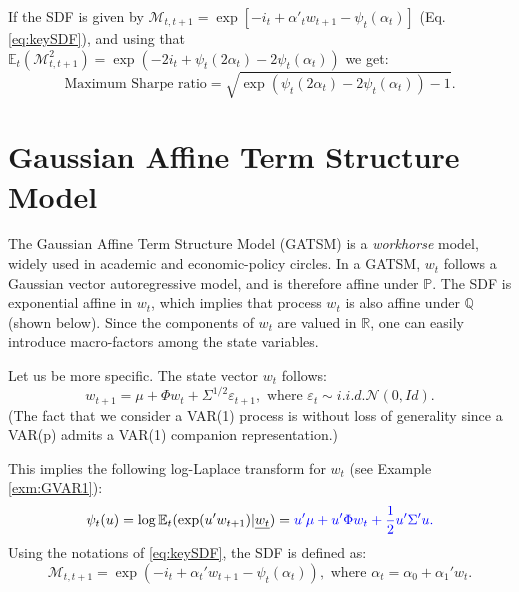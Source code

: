 \documentclass[
  12pt,
]{book}
\theoremstyle{definition}
\theoremstyle{definition}
\theoremstyle{definition}
\theoremstyle{definition}
\theoremstyle{remark}
\begin{document}
If the SDF is given by \(\mathcal{M}_{t,t+1} = \exp[-i_{t}+\alpha'_tw_{t+1}-\psi_t(\alpha_t)]\) (Eq. \eqref{eq:keySDF}), and using that \(\mathbb{E}_t(\mathcal{M}_{t,t+1}^2)=\exp(-2i_t+\psi_t(2\alpha_t)-2\psi_t(\alpha_t))\) we get:
\[
\mbox{Maximum Sharpe ratio} = \sqrt{\exp(\psi_t(2\alpha_t)-2\psi_t(\alpha_t)) - 1}.
\]

\hypertarget{RiskFreeGaussian}{%
\section{Gaussian Affine Term Structure Model}\label{RiskFreeGaussian}}

The Gaussian Affine Term Structure Model (GATSM) is a \emph{workhorse} model, widely used in academic and economic-policy circles. In a GATSM, \(w_t\) follows a Gaussian vector autoregressive model, and is therefore affine under \(\mathbb{P}\). The SDF is exponential affine in \(w_t\), which implies that process \(w_t\) is also affine under \(\mathbb{Q}\) (shown below). Since the components of \(w_t\) are valued in \(\mathbb{R}\), one can easily introduce macro-factors among the state variables.

Let us be more specific. The state vector \(w_t\) follows:
\begin{equation}
w_{t+1} = \mu + \Phi w_{t} + \Sigma^{1/2} \varepsilon_{t+1}, \mbox{ where } \varepsilon_{t} \sim  i.i.d. \mathcal{N}(0,Id).\label{eq:GaussianVAR1}
\end{equation}
(The fact that we consider a VAR(1) process is without loss of generality since a VAR(p) admits a VAR(1) companion representation.)

This implies the following log-Laplace transform for \(w_t\) (see Example \ref{exm:GVAR1}):
\[
\psi_t(u) = \log \mathbb{E}_t(\exp(u'w_{t+1})|\underline{w_t}) = \color{blue}{u'\mu + u'\Phi w_t + \frac{1}{2}u'\Sigma'u}.
\]
Using the notations of \eqref{eq:keySDF}, the SDF is defined as:
\[
\mathcal{M}_{t,t+1} = \exp(- i_t + \alpha_t'w_{t+1} - \psi_t(\alpha_t)), \mbox{ where } \alpha_t = \alpha_0 + \alpha_1'w_t.
\]
\end{document}
